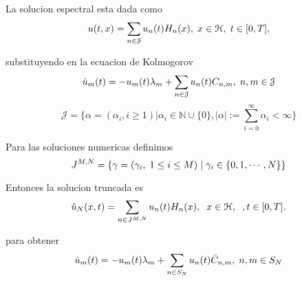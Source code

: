 \begin{frame}
	La solucion espectral esta dada como
	\begin{align*}
		u(t, x) = \displaystyle \sum _{n \in \mathcal{J}} u_{n}(t) H_n (x), \hspace{0.1cm} x \in \mathcal{H}, \hspace{0.1cm} t \in [0, T],
	\end{align*}		
	
	substituyendo en la ecuacion de Kolmogorov 
	\begin{equation*}
		\dot{u}_{m} (t) = -u_{m} (t) \lambda_{m} + \displaystyle \sum _{n \in \mathcal{J}} u_{n} (t) C_{n, m} , \hspace{0.1cm} n, m \in \mathcal{J}
	\end{equation*}
	\begin{equation*}
		\mathcal{J} = \{\alpha = (\alpha_i,i \geq 1) | \alpha_i \in \mathbb{N}\cup \{0\}, |\alpha|:= \displaystyle \sum _{i = 0}^{\infty}\alpha_i < \infty\}
	\end{equation*}
\end{frame}

\begin{frame}	
	Para las soluciones numericas definimos 
	\begin{equation*}
		J^{M, N} = \{\gamma = (\gamma_i, \hspace{1mm} 1 \leq i \leq M  ) \hspace{1mm} | \hspace{1mm} \gamma_i \in \{0, 1, \cdots, N \} \}
	\end{equation*}
	
	Entonces la solucion truncada es 
	\begin{equation*}
		\hat{u}_N (x, t) = \displaystyle \sum_{ n \in J^{M, N} } u_n (t) H_n (x), \hspace{2mm} x \in \mathcal{H}, \hspace{2mm}, t \in [0, T].
	\end{equation*}
	
	para obtener
	\begin{equation*}
		\dot{u}_{m} (t) = -u_{m} (t) \lambda_{m} + \displaystyle \sum _{n \in S_N} u_{n} (t) \bar{C}_{n, m} , \hspace{0.1cm} n, m \in S_N
	\end{equation*}
\end{frame}
	
